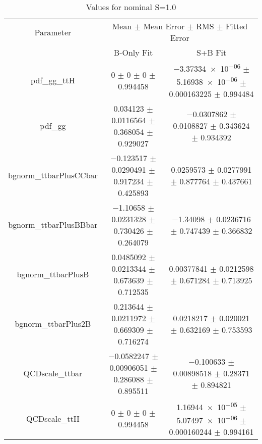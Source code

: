 \begin{table}
\centering
\caption{Values for nominal S=1.0}
\begin{tabular}{ccc}
\toprule
Parameter & \multicolumn{2}{c}{Mean $\pm$ Mean Error $\pm$ RMS $\pm$ Fitted Error}\\
 & B-Only Fit & S+B Fit\\
\midrule
pdf\_gg\_ttH & \num{0} $\pm$ \num{0} $\pm$ \num{0} $\pm$ \num{0.994458} & \num{-3.37334e-06} $\pm$ \num{5.16938e-06} $\pm$ \num{0.000163225} $\pm$ \num{0.994484}\\
pdf\_gg & \num{0.034123} $\pm$ \num{0.0116564} $\pm$ \num{0.368054} $\pm$ \num{0.929027} & \num{-0.0307862} $\pm$ \num{0.0108827} $\pm$ \num{0.343624} $\pm$ \num{0.934392}\\
bgnorm\_ttbarPlusCCbar & \num{-0.123517} $\pm$ \num{0.0290491} $\pm$ \num{0.917234} $\pm$ \num{0.425893} & \num{0.0259573} $\pm$ \num{0.0277991} $\pm$ \num{0.877764} $\pm$ \num{0.437661}\\
bgnorm\_ttbarPlusBBbar & \num{-1.10658} $\pm$ \num{0.0231328} $\pm$ \num{0.730426} $\pm$ \num{0.264079} & \num{-1.34098} $\pm$ \num{0.0236716} $\pm$ \num{0.747439} $\pm$ \num{0.366832}\\
bgnorm\_ttbarPlusB & \num{0.0485092} $\pm$ \num{0.0213344} $\pm$ \num{0.673639} $\pm$ \num{0.712535} & \num{0.00377841} $\pm$ \num{0.0212598} $\pm$ \num{0.671284} $\pm$ \num{0.713925}\\
bgnorm\_ttbarPlus2B & \num{0.213644} $\pm$ \num{0.0211972} $\pm$ \num{0.669309} $\pm$ \num{0.716274} & \num{0.0218217} $\pm$ \num{0.020021} $\pm$ \num{0.632169} $\pm$ \num{0.753593}\\
QCDscale\_ttbar & \num{-0.0582247} $\pm$ \num{0.00906051} $\pm$ \num{0.286088} $\pm$ \num{0.895511} & \num{-0.100633} $\pm$ \num{0.00898518} $\pm$ \num{0.28371} $\pm$ \num{0.894821}\\
QCDscale\_ttH & \num{0} $\pm$ \num{0} $\pm$ \num{0} $\pm$ \num{0.994458} & \num{1.16944e-05} $\pm$ \num{5.07497e-06} $\pm$ \num{0.000160244} $\pm$ \num{0.994161}\\
\bottomrule
\end{tabular}
\end{table}